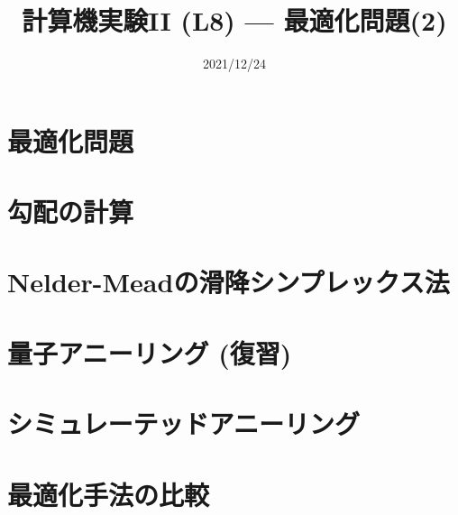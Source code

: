 \documentclass[10pt,dvipdfmx]{beamer}
\title{計算機実験II (L8) --- 最適化問題(2)}
\date{2021/12/24}
\begin{document}
\begin{frame}
  \titlepage
  \tableofcontents
\end{frame}

\section{最適化問題}




\section{勾配の計算}


% 












\section{Nelder-Meadの滑降シンプレックス法}





\section{量子アニーリング (復習)}




\section{シミュレーテッドアニーリング}





\section{最適化手法の比較}







\end{document}
